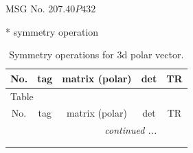 \documentclass[fleqn,8pt]{jsarticle}
\begin{document}
\setcounter{MaxMatrixCols}{32}

\renewcommand{\tablename}{Table~}
\renewcommand{\figurename}{Figure~}
\begin{center}
\LARGE
MSG No. 207.40\quad$P432$
\end{center}
* symmetry operation
\renewcommand{\arraystretch}{1.3}
\begin{longtable}{ccccc}
\caption{Symmetry operations for 3d polar vector.}
 \\
 \hline \hline
No. & tag & matrix (polar) & det & TR \\ \hline \endfirsthead

\multicolumn{4}{l}{\tablename\ \thetable{}} \\
 \hline \hline
No. & tag & matrix (polar) & det & TR \\ \hline \endhead

 \hline \hline
\multicolumn{4}{r}{\footnotesize\it continued ...} \\ \endfoot

 \hline \hline
\multicolumn{4}{r}{} \\ \endlastfoot


\end{longtable}
\end{document}
